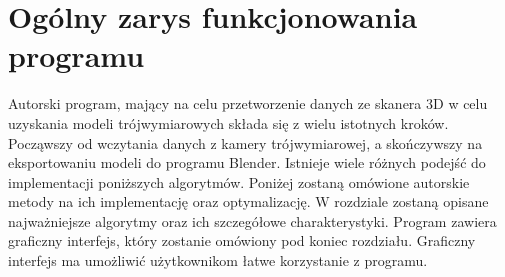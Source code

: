 \section{Ogólny zarys funkcjonowania programu}
Autorski program, mający na celu przetworzenie danych ze skanera 3D w celu uzyskania modeli trójwymiarowych składa się z wielu istotnych kroków. Począwszy od wczytania danych z kamery trójwymiarowej, a skończywszy na eksportowaniu modeli do programu Blender. Istnieje wiele różnych podejść do implementacji poniższych algorytmów. Poniżej zostaną omówione autorskie metody na ich implementację oraz optymalizację. W rozdziale zostaną opisane najważniejsze algorytmy oraz ich szczegółowe charakterystyki. Program zawiera graficzny interfejs, który zostanie omówiony pod koniec rozdziału. Graficzny interfejs ma umożliwić użytkownikom łatwe korzystanie z programu.
